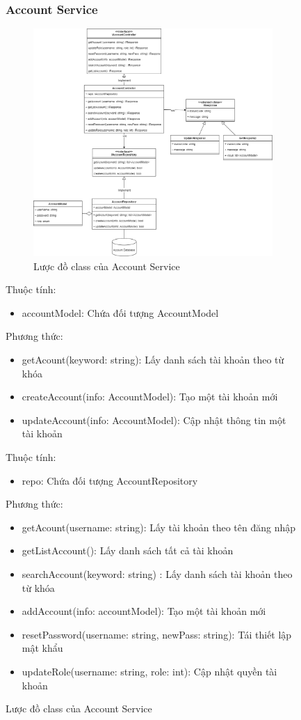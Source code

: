 \begin{figure}[!htp]
\subsubsection{Account Service}
\begin{figure}[!htp]
	\centering
	\includegraphics[width=11cm]{img/Architecture/service/AccountService.png}
	\newline
	\caption{Lược đồ class của Account Service}
\end{figure}

Thuộc tính:
\begin{itemize}
	\item accountModel: Chứa đối tượng AccountModel
\end{itemize}
Phương thức:
\begin{itemize}
	\item getAcount(keyword: string): Lấy danh sách tài khoản theo từ khóa
	\item createAccount(info: AccountModel): Tạo một tài khoản mới
	\item updateAccount(info: AccountModel): Cập nhật thông tin một tài khoản
\end{itemize}

Thuộc tính:
\begin{itemize}
	\item repo: Chứa đối tượng AccountRepository
\end{itemize}
Phương thức:
\begin{itemize}
	\item getAcount(username: string): Lấy tài khoản theo tên đăng nhập
	\item getListAccount(): Lấy danh sách tất cả tài khoản
	\item searchAccount(keyword: string) : Lấy danh sách tài khoản theo từ khóa
	\item addAccount(info: accountModel): Tạo một tài khoản mới
	\item resetPassword(username: string, newPass: string): Tái thiết lập mật khẩu	
	\item updateRole(username: string, role: int): Cập nhật quyền tài khoản
\end{itemize}



\end{figure}
